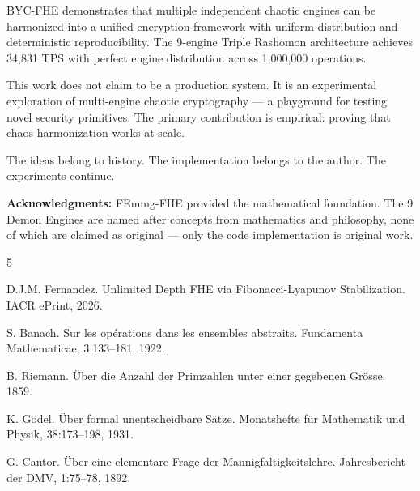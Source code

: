 \documentclass[11pt,a4paper]{article}
\begin{document}
BYC-FHE demonstrates that multiple independent chaotic engines can be harmonized into a unified encryption framework with uniform distribution and deterministic reproducibility. The 9-engine Triple Rashomon architecture achieves 34,831 TPS with perfect engine distribution across 1,000,000 operations.

This work does not claim to be a production system. It is an experimental exploration of multi-engine chaotic cryptography — a playground for testing novel security primitives. The primary contribution is empirical: proving that chaos harmonization works at scale.

The ideas belong to history. The implementation belongs to the author. The experiments continue.

\textbf{Acknowledgments:} FEmmg-FHE provided the mathematical foundation. The 9 Demon Engines are named after concepts from mathematics and philosophy, none of which are claimed as original — only the code implementation is original work.

\begin{thebibliography}{5}

 D.J.M. Fernandez. Unlimited Depth FHE via Fibonacci-Lyapunov Stabilization. IACR ePrint, 2026.

 S. Banach. Sur les op\'erations dans les ensembles abstraits. Fundamenta Mathematicae, 3:133–181, 1922.

 B. Riemann. \"Uber die Anzahl der Primzahlen unter einer gegebenen Gr\"osse. 1859.

 K. G\"odel. \"Uber formal unentscheidbare S\"atze. Monatshefte f\"ur Mathematik und Physik, 38:173–198, 1931.

 G. Cantor. \"Uber eine elementare Frage der Mannigfaltigkeitslehre. Jahresbericht der DMV, 1:75–78, 1892.

\end{thebibliography}
\end{document}
